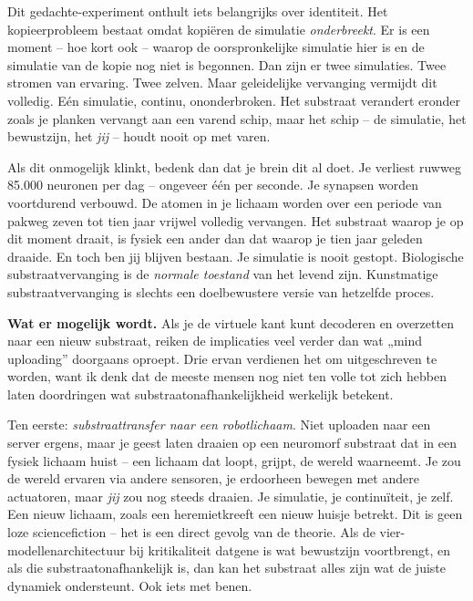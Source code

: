 \documentclass[11pt, twoside, openright]{book}
\begin{document}
Dit gedachte-experiment onthult iets belangrijks over identiteit. Het kopieerprobleem bestaat omdat kopiëren de simulatie \textit{onderbreekt}. Er is een moment -- hoe kort ook -- waarop de oorspronkelijke simulatie hier is en de simulatie van de kopie nog niet is begonnen. Dan zijn er twee simulaties. Twee stromen van ervaring. Twee zelven. Maar geleidelijke vervanging vermijdt dit volledig. Eén simulatie, continu, ononderbroken. Het substraat verandert eronder zoals je planken vervangt aan een varend schip, maar het schip -- de simulatie, het bewustzijn, het \textit{jij} -- houdt nooit op met varen.

Als dit onmogelijk klinkt, bedenk dan dat je brein dit al doet. Je verliest ruwweg 85.000 neuronen per dag -- ongeveer één per seconde. Je synapsen worden voortdurend verbouwd. De atomen in je lichaam worden over een periode van pakweg zeven tot tien jaar vrijwel volledig vervangen. Het substraat waarop je op dit moment draait, is fysiek een ander dan dat waarop je tien jaar geleden draaide. En toch ben jij blijven bestaan. Je simulatie is nooit gestopt. Biologische substraatvervanging is de \textit{normale toestand} van het levend zijn. Kunstmatige substraatvervanging is slechts een doelbewustere versie van hetzelfde proces.

\textbf{Wat er mogelijk wordt.} Als je de virtuele kant kunt decoderen en overzetten naar een nieuw substraat, reiken de implicaties veel verder dan wat „mind uploading” doorgaans oproept. Drie ervan verdienen het om uitgeschreven te worden, want ik denk dat de meeste mensen nog niet ten volle tot zich hebben laten doordringen wat substraatonafhankelijkheid werkelijk betekent.

Ten eerste: \textit{substraattransfer naar een robotlichaam}. Niet uploaden naar een server ergens, maar je geest laten draaien op een neuromorf substraat dat in een fysiek lichaam huist -- een lichaam dat loopt, grijpt, de wereld waarneemt. Je zou de wereld ervaren via andere sensoren, je erdoorheen bewegen met andere actuatoren, maar \textit{jij} zou nog steeds draaien. Je simulatie, je continuïteit, je zelf. Een nieuw lichaam, zoals een heremietkreeft een nieuw huisje betrekt. Dit is geen loze sciencefiction -- het is een direct gevolg van de theorie. Als de vier-modellenarchitectuur bij kritikaliteit datgene is wat bewustzijn voortbrengt, en als die substraatonafhankelijk is, dan kan het substraat alles zijn wat de juiste dynamiek ondersteunt. Ook iets met benen.
\end{document}
